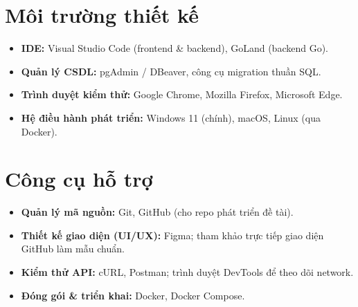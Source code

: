 \section{Môi trường thiết kế}
\begin{itemize}
\item \textbf{IDE:} Visual Studio Code (frontend \& backend), GoLand (backend Go).
\item \textbf{Quản lý CSDL:} pgAdmin / DBeaver, công cụ migration thuần SQL.
\item \textbf{Trình duyệt kiểm thử:} Google Chrome, Mozilla Firefox, Microsoft Edge.
\item \textbf{Hệ điều hành phát triển:} Windows 11 (chính), macOS, Linux (qua Docker).
\end{itemize}

\section{Công cụ hỗ trợ}
\begin{itemize}
\item \textbf{Quản lý mã nguồn:} Git, GitHub (cho repo phát triển đề tài).
\item \textbf{Thiết kế giao diện (UI/UX):} Figma; tham khảo trực tiếp giao diện GitHub làm mẫu chuẩn.
\item \textbf{Kiểm thử API:} cURL, Postman; trình duyệt DevTools để theo dõi network.
\item \textbf{Đóng gói \& triển khai:} Docker, Docker Compose.
\end{itemize}
